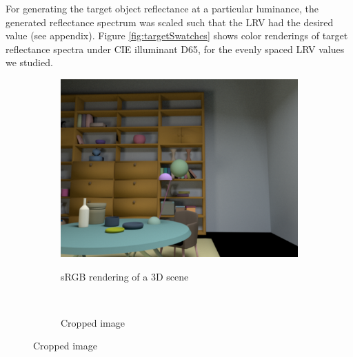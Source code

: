 \documentclass{jov}
\begin{document}
For generating the target object reflectance at a particular luminance, the generated reflectance spectrum was 
scaled such that the LRV had the desired value (see appendix).
Figure \ref{fig:targetSwatches} shows color renderings of target reflectance spectra under CIE illuminant D65, for the evenly spaced LRV values we studied.

\begin{figure}
\centering
\begin{subfigure}[b]{0.25 \textwidth}
		\centering
        \caption{sRGB rendering of a 3D scene}
        \includegraphics[width=\textwidth]{../FiguresDraft4/Figure9/Figure9_a.png}
        \label{fig:3DScene}
    \end{subfigure}
    ~ 
    \begin{subfigure}[b]{0.19 \textwidth}   
    \hspace{0.1 \textwidth}
        \caption{Cropped image}
        \vspace{1.5mm}

\end{subfigure}
\end{figure}
\end{document}

